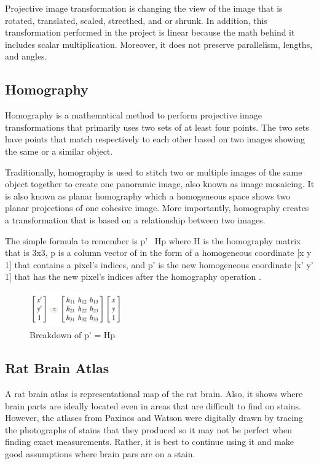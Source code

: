 \documentclass[10pt,twocolumn]{article}
\begin{document}
Projective image transformation is changing the view of the image that is rotated, translated, scaled, strecthed, and or shrunk. In addition, this transformation performed in the project is linear because the math behind it includes scalar multiplication. Moreover, it does not preserve parallelism, lengths, and angles.

\subsection{Homography}

Homography is a mathematical method to perform projective image transformations that primarily uses two sets of at least four points. The two sets have points that match respectively to each other based on two images showing the same or a similar object. 

Traditionally, homography is used to stitch two or multiple images of the same object together to create one panoramic image, also known as image mosaicing. It is also known as planar homography which a homogeneous space shows two planar projections of one cohesive image. More importantly, homography creates a transformation that is based on a relationship between two images. 

The simple formula to remember is p'~ Hp where H is the homography matrix that is 3x3, p is a column vector of in the form of a homogeneous coordinate [x y 1] that contains a pixel's indices, and p' is the new homogeneous coordinate [x' y' 1] that has the new pixel's indices after the homography operation \cite{php}. 

\begin{figure}[htp]
    \centering
    \includegraphics[width=4cm]{pHp.png}
    \caption{Breakdown of p' = Hp}
\end{figure}



\subsection{Rat Brain Atlas}
A rat brain atlas is representational map of the rat brain. Also, it shows where brain parts are ideally located even in areas that are difficult to find on stains. However, the atlases from Paxinos and Watson were digitally drawn by tracing the photographs of stains that they produced so it may not be perfect when finding exact measurements. Rather, it is best to continue using it and make good assumptions where brain pars are on a stain. 
\end{document}
